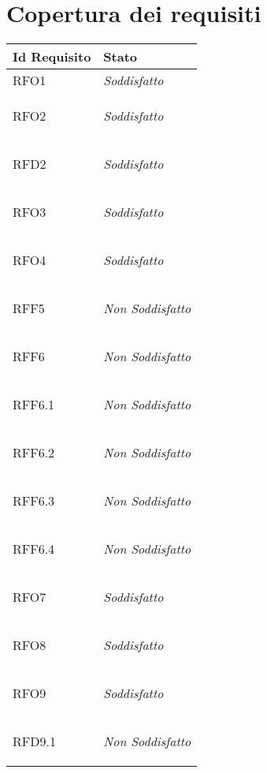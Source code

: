 \section{Copertura dei requisiti}
\normalsize
\begin{longtable}{|>{\centering}m{5cm}|m{5cm}<{\centering}|}
    \hline
    \textbf{Id Requisito} & \textbf{Stato}\\
    \hline
    \endhead
    \hypertarget{RFO1}{RFO1} & \textit{Soddisfatto}\\ \hline
   
    \hypertarget{RFO2}{RFO2} & \textit{Soddisfatto}\\ \hline
   
    \hypertarget{RFD2}{RFD2} & \textit{Soddisfatto}\\ \hline
   
    \hypertarget{RFO3}{RFO3} & \textit{Soddisfatto}\\ \hline
   
    \hypertarget{RFO4}{RFO4} & \textit{Soddisfatto}\\ \hline
   
    \hypertarget{RFF5}{RFF5} & \textit{Non Soddisfatto}\\ \hline
   
    \hypertarget{RFF6}{RFF6} & \textit{Non Soddisfatto}\\ \hline
   
    \hypertarget{RFF6.1}{RFF6.1} & \textit{Non Soddisfatto}\\ \hline
   
    \hypertarget{RFF6.2}{RFF6.2} & \textit{Non Soddisfatto}\\ \hline
   
    \hypertarget{RFF6.3}{RFF6.3} & \textit{Non Soddisfatto}\\ \hline
   
    \hypertarget{RFF6.4}{RFF6.4} & \textit{Non Soddisfatto}\\ \hline
   
    \hypertarget{RFO7}{RFO7} & \textit{Soddisfatto}\\ \hline
   
    \hypertarget{RFO8}{RFO8} & \textit{Soddisfatto}\\ \hline
   
    \hypertarget{RFO9}{RFO9} & \textit{Soddisfatto}\\ \hline
   
    \hypertarget{RFD9.1}{RFD9.1}  & \textit{Non Soddisfatto}\\ \hline
   

\end{longtable}
